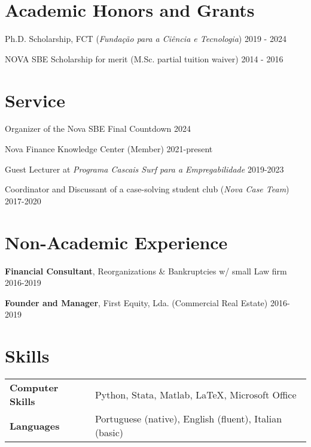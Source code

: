 \documentclass[letterpaper]{article}
\newenvironment{itemize*}{
  \begin{list}{}{
    \setlength{\leftmargin}{1.5em}
  }
}{
  \end{list}
}
\begin{document}
\section*{Academic Honors and Grants}

\begin{itemize*}
\item Ph.D. Scholarship, FCT (\textit{Fundação para a Ciência e Tecnologia}) \hfill 2019 - 2024
\item NOVA SBE Scholarship for merit (M.Sc. partial tuition waiver) \hfill 2014 - 2016
\end{itemize*}

\section*{Service}
\begin{itemize*}
\item Organizer of the Nova SBE Final Countdown \hfill 2024
\item Nova Finance Knowledge Center (Member) \hfill 2021-present
\item Guest Lecturer at \textit{Programa Cascais Surf para a Empregabilidade} \hfill 2019-2023
\item Coordinator and Discussant of a case-solving student club (\textit{Nova Case Team}) \hfill 2017-2020
\end{itemize*}

\section*{Non-Academic Experience}

\begin{itemize*}
\item \textbf{Financial Consultant}, Reorganizations \& Bankruptcies w/ small Law firm \hfill 2016-2019
\item \textbf{Founder and Manager}, First Equity, Lda. (Commercial Real Estate) \hfill 2016-2019
\end{itemize*}

\section*{Skills}
\renewcommand{\arraystretch}{1.25}
\begin{table}[h]
 \vspace*{-\baselineskip}
\begin{tabular}{l l}
\textbf{Computer Skills} & Python, Stata, Matlab, \LaTeX, Microsoft Office \\
\textbf{Languages} & Portuguese (native), English (fluent), Italian (basic)
\end{tabular}
\end{table}
\end{document}
